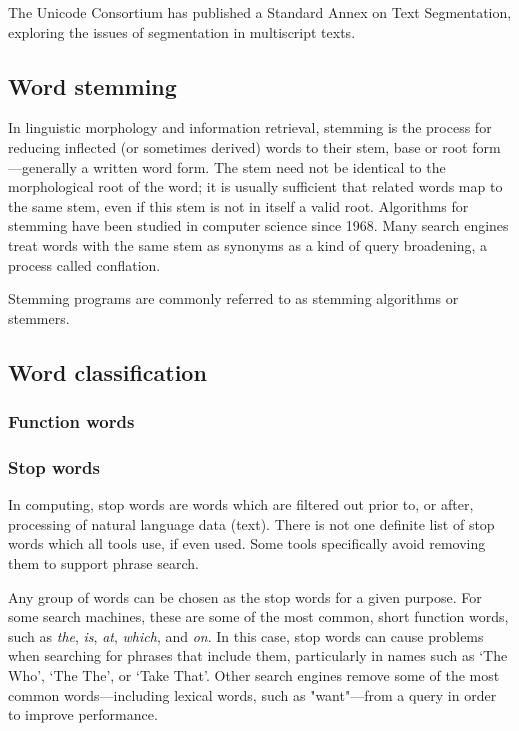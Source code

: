     The Unicode Consortium has published a Standard Annex\cite{Davis2012} on Text Segmentation, exploring the issues of segmentation in multiscript texts.
      

  \subsection{Word stemming}

    In linguistic morphology and information retrieval, stemming is the process for reducing inflected (or sometimes derived) words to their stem, base or root form—generally a written word form. The stem need not be identical to the morphological root of the word; it is usually sufficient that related words map to the same stem, even if this stem is not in itself a valid root. Algorithms for stemming have been studied in computer science since 1968. Many search engines treat words with the same stem as synonyms as a kind of query broadening, a process called conflation.

    Stemming programs are commonly referred to as stemming algorithms or stemmers.      

  \subsection{Word classification}

    \subsubsection{Function words}
      
    \subsubsection{Stop words}

      In computing, stop words are words which are filtered out prior to, or after, processing of natural language data (text). There is not one definite list of stop words which all tools use, if even used. Some tools specifically avoid removing them to support phrase search.

      Any group of words can be chosen as the stop words for a given purpose. For some search machines, these are some of the most common, short function words, such as \emph{the}, \emph{is}, \emph{at}, \emph{which}, and \emph{on}. In this case, stop words can cause problems when searching for phrases that include them, particularly in names such as `The Who', `The The', or `Take That'. Other search engines remove some of the most common words—including lexical words, such as "want"—from a query in order to improve performance.

